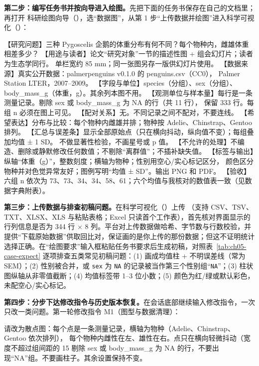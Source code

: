 \textbf{第二步：编写任务书并按向导进入绘图。}先把下面的任务书保存在自己的文档里；再打开 \scidraw{} 科研绘图向导（），选“数据图”，从第 1 步“上传数据并绘图”进入科学可视化（）：

\begin{Prompt}
【研究问题】三种 Pygoscelis 企鹅的体重分布有何不同？每个物种内，雌雄体重相差多少？
【用途与读者】论文“研究对象”一节的描述性图 + 组会幻灯片；读者为生态学同行。
             单栏宽约 85 mm；同一张图另存一版供幻灯片使用。
【数据来源】真实公开数据：palmerpenguins v0.1.0 的 penguins.csv（CC0），
             Palmer Station LTER，2007–2009。
【字段与单位】species（分组）、sex（分组）、body_mass_g（体重，g）。其余列本图不用。
【观测单位与样本量】每行是一条测量记录。剔除 sex 或 body_mass_g 为 NA 的行（共 11 行），
             保留 333 行。每组 n 必须在图上可见。
【配对关系】无。不同记录之间不配对，不要连线。
【希望表达】分布与比较：每个物种内雌雄并排；物种按 Adelie、Chinstrap、Gentoo 排列。
【汇总与误差条】显示全部原始点（只在横向抖动，纵向值不变）；每组叠加均值 ± 1 SD。
             不做显著性检验，不画星号或 p 值。
【不允许的处理】不编造、删除或静默修改任何数值；不剔除“离群值”；不插补缺失值。
【标签与输出】纵轴“体重（g）”，整数刻度；横轴为物种；性别用空心/实心标记区分，
             颜色区分物种并对色觉异常友好；图例写明“均值 ± SD”。输出 PNG 和 PDF。
【验收】六组 n 依次为 73、73、34、34、58、61；六个均值与我核对的数值表一致（见数据字典附表）。
\end{Prompt}

\textbf{第三步：上传数据与排查初稿问题。}在科学可视化（）上传 （支持 CSV、TSV、TXT、XLSX、XLS 与粘贴表格；Excel 只读首个工作表），首先核对界面显示的行列信息是否为 344 行 $\times$ 8 列。平台对上传数据做哈希、字节数与行数校验，并提供“下载原始数据”供取回比对，保证画的是你上传的那份数据；但这不证明统计选择正确。在“绘图要求”输入框粘贴任务书要求后生成初稿，对照表~\ref{tab:ch05-case-expect} 逐项排查五类常见初稿问题：(1) 画成均值柱 + 不明误差线（常为 SEM）；(2) 性别被合并，或 \texttt{sex} 为 \texttt{NA} 的记录被当作第三个性别组“\texttt{NA}”；(3) 柱状图纵轴从非零值截断；(4) 均值标签带 1–3 位小数；(5) 颜色为红/绿或默认彩色，未配空心/实心标记。

\textbf{第四步：分步下达修改指令与历史版本恢复。}在会话底部继续输入修改指令，一次只改一类问题。第一轮修改指令 M1（图型与数据清理）：

\begin{Prompt}
请改为散点图：每个点是一条测量记录，横轴为物种（Adelie、Chinstrap、Gentoo 依次排列），
每个物种内雌性在左、雄性在右。点只在横向轻微抖动（宽度不超过组间距的 15%
剔除 sex 或 body_mass_g 为 NA 的行，不要出现“NA”组。不要画柱子。其余设置保持不变。
\end{Prompt}

